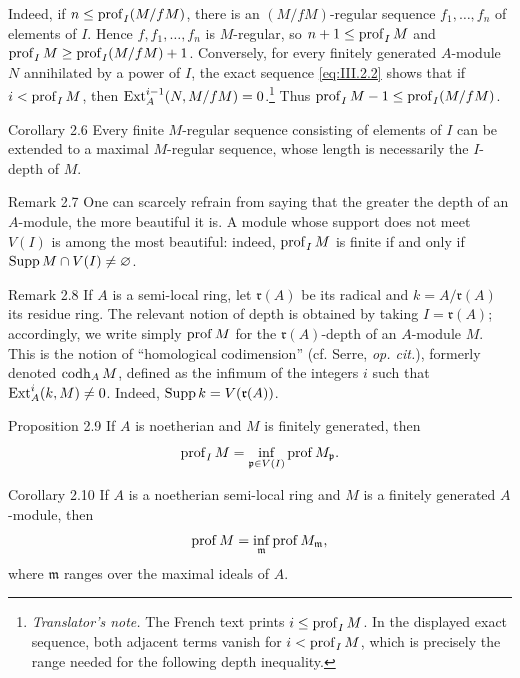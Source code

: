 Indeed, if $n\le\operatorname{prof}_I(M/fM)$, there is an $(M/fM)$-regular sequence
$f_1,\ldots,f_n$ of elements of $I$. Hence $f,f_1,\ldots,f_n$ is
$M$-regular, so $n+1\le\operatorname{prof}_I M$ and
$\operatorname{prof}_I M\ge\operatorname{prof}_I(M/fM)+1$. Conversely, for every finitely generated
$A$-module $N$ annihilated by a power of $I$, the exact sequence
  \eqref{eq:III.2.2} shows that if $i<\operatorname{prof}_I M$, then
  $\operatorname{Ext}_A^{i-1}(N,M/fM)=0$.\footnote{\textit{Translator's note.}
  The French text prints $i\le\operatorname{prof}_I M$. In the displayed exact
  sequence, both adjacent terms vanish for $i<\operatorname{prof}_I M$, which is
  precisely the range needed for the following depth inequality.} Thus
$\operatorname{prof}_I M-1\le\operatorname{prof}_I(M/fM)$.

\begin{sgastatement}{Corollary 2.6}
Every finite $M$-regular sequence consisting of elements of $I$ can be
extended to a maximal $M$-regular sequence, whose length is necessarily the
$I$-depth of $M$.
\end{sgastatement}

\begin{sgastatement}{Remark 2.7}
One can scarcely refrain from saying that the greater the depth of an
$A$-module, the more beautiful it is. A module whose support does not meet
$V(I)$ is among the most beautiful: indeed, $\operatorname{prof}_I M$ is finite if and
only if $\operatorname{Supp} M\cap V(I)\ne\varnothing$.
\end{sgastatement}

\begin{sgastatement}{Remark 2.8}
If $A$ is a semi-local ring, let $\mathfrak r(A)$ be its radical and
$k=A/\mathfrak r(A)$ its residue ring. The relevant notion of depth is
obtained by taking $I=\mathfrak r(A)$; accordingly, we write simply
$\operatorname{prof} M$ for the $\mathfrak r(A)$-depth of an $A$-module $M$. This is the
notion of ``homological codimension'' (cf. Serre, \emph{op. cit.}), formerly
denoted $\operatorname{codh}_A M$, defined as the infimum of the integers $i$ such that
$\operatorname{Ext}_A^i(k,M)\ne0$. Indeed, $\operatorname{Supp} k=V(\mathfrak r(A))$.
\end{sgastatement}

\begin{sgastatement}{Proposition 2.9}
If $A$ is noetherian and $M$ is finitely generated, then
\[
  \operatorname{prof}_I M=\inf_{\mathfrak p\in V(I)}\operatorname{prof} M_{\mathfrak p}.
\]
\end{sgastatement}

\begin{sgastatement}{Corollary 2.10}
If $A$ is a noetherian semi-local ring and $M$ is a finitely generated
$A$-module, then
\[
  \operatorname{prof} M=\inf_{\mathfrak m}\operatorname{prof} M_{\mathfrak m},
\]
where $\mathfrak m$ ranges over the maximal ideals of $A$.
\end{sgastatement}

